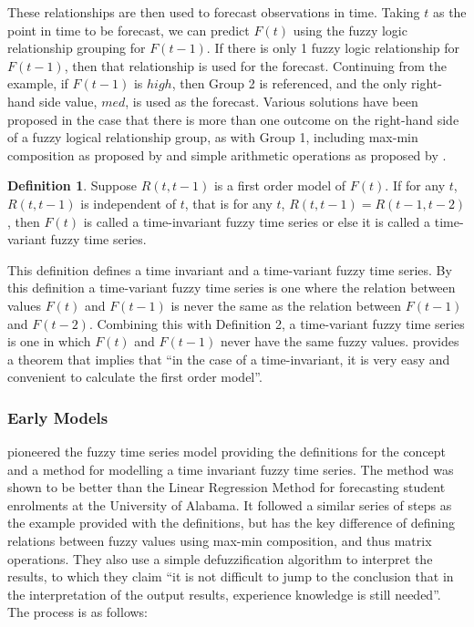 \documentclass{article}
\theoremstyle{definition}
\newtheorem{ftsdef}{Definition}
\begin{document}
These relationships are then used to forecast observations in time. Taking $t$ as the point in time to be forecast, we can predict $F(t)$ using the fuzzy logic relationship grouping for $F(t-1)$. If there is only 1 fuzzy logic relationship for $F(t-1)$, then that relationship is used for the forecast. Continuing from the example, if $F(t-1)$ is $high$, then Group 2 is referenced, and the only right-hand side value, $med$, is used as the forecast. Various solutions have been proposed in the case that there is more than one outcome on the right-hand side of a fuzzy logical relationship group, as with Group 1, including max-min composition as proposed by \cite{song1993forecasting} and simple arithmetic operations as proposed by \cite{chen1996forecasting}.

\begin{ftsdef}
Suppose $R(t,t-1)$ is a first order model of $F(t)$. If for any $t$, $R(t,t-1)$ is independent of $t$, that is for any $t$, $R(t,t-1) = R(t-1,t-2)$, then $F(t)$ is called a time-invariant fuzzy time series or else it is called a time-variant fuzzy time series.
\end{ftsdef}

This definition defines a time invariant and a time-variant fuzzy time series. By this definition a time-variant fuzzy time series is one where the relation between values $F(t)$ and $F(t-1)$ is never the same as the relation between $F(t-1)$ and $F(t-2)$. Combining this with Definition 2, a time-variant fuzzy time series is one in which $F(t)$ and $F(t-1)$ never have the same fuzzy values. \cite{song1993forecasting} provides a theorem that implies that ``in the case of a time-invariant, it is very easy and convenient to calculate the first order model''.

\subsubsection{Early Models}

\cite{song1993forecasting} pioneered the fuzzy time series model providing the definitions for the concept and a method for modelling a time invariant fuzzy time series. The method was shown to be better than the Linear Regression Method for forecasting student enrolments at the University of Alabama. It followed a similar series of steps as the example provided with the definitions, but has the key difference of defining relations between fuzzy values using max-min composition, and thus matrix operations. They also use a simple defuzzification algorithm to interpret the results, to which they claim ``it is not difficult to jump to the conclusion that in the interpretation of the output results, experience knowledge is still needed''. The process is as follows:
\end{document}
